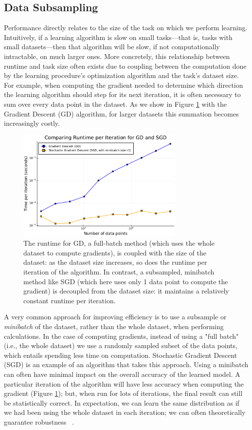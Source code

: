 \documentclass[sigplan,screen]{acmart}
\begin{document}
\subsection{Data Subsampling} \label{sec:subsampling}
Performance directly relates to the size of the task on which we perform learning. Intuitively, if a learning algorithm is slow on small tasks---that is, tasks with small datasets---then that algorithm will be slow, if not computationally intractable, on much larger ones. More concretely, this relationship between runtime and task size often exists due to coupling between the computation done by the learning procedure's optimization algorithm and the task's dataset size. For example, when computing the gradient needed to determine which direction the learning algorithm should step for its next iteration, it is often necessary to sum over every data point in the dataset. As we show in Figure \ref{fig:time} with the Gradient Descent (GD) algorithm, for larger datasets this summation becomes increasingly costly.

\begin{figure}[h]
	\includegraphics[width=8.25cm]{figs/timesgd.pdf}
	\caption{The runtime for GD, a full-batch method (which uses the whole dataset to compute gradients), is coupled with the size of the dataset: as the dataset size increases, so does the runtime per iteration of the algorithm. In contrast, a subsampled, minibatch method like SGD (which here uses only 1 data point to compute the gradient) is decoupled from the dataset size: it maintains a relatively constant runtime per iteration.}
	\label{fig:time}
\end{figure}

A very common approach for improving efficiency is to use a subsample or \emph{minibatch} of the dataset, rather than the whole dataset, when performing calculations. In the case of computing gradients, instead of using a "full batch" (i.e., the whole dataset) we use a randomly sampled subset of the data points, which entails spending less time on computation. Stochastic Gradient Descent (SGD) is an example of an algorithm that takes this approach. Using a minibatch can often have minimal impact on the overall accuracy of the learned model. A particular iteration of the algorithm will have less accuracy when computing the gradient (Figure \ref{fig:time}); but, when run for lots of iterations, the final result can still be statistically correct. In expectation, we can learn the same distribution as if we had been using the whole dataset in each iteration; we can often theoretically guarantee robustness ~\cite{Kiefer1952StochasticEO, Bottou2018sgd}.
\end{document}
